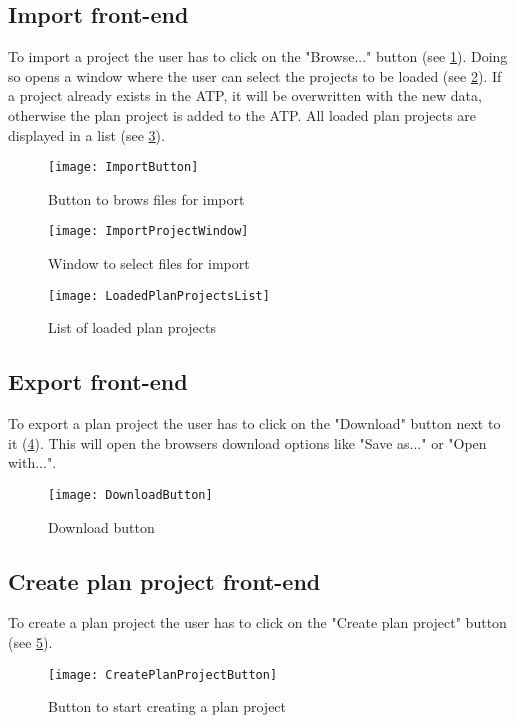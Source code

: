 \subsection{Import front-end}
 To import a project the user has to click on the "Browse..." button (see \ref{importButton}). Doing so opens a window where the user can select the projects to be loaded (see \ref{importWindow}). If a project already exists in the ATP, it will be overwritten with the new data, otherwise the plan project is added to the ATP. All loaded plan projects are displayed in a list (see \ref{loadedPlanProjects}).
\begin{figure}[H]
	\centering
	\texttt{[image: ImportButton]}
	\caption{Button to brows files for import}
	\label{importButton}
\end{figure}
\begin{figure}[H]
	\centering
	\texttt{[image: ImportProjectWindow]}
	\caption{Window to select files for import}
	\label{importWindow}
\end{figure}
\begin{figure}[H]
	\centering
	\texttt{[image: LoadedPlanProjectsList]}
	\caption{List of loaded plan projects}
	\label{loadedPlanProjects}
\end{figure}

\subsection{Export front-end}
To export a plan project the user has to click on the "Download" button next to it (\ref{downloadButton}). This will open the browsers download options like "Save as..." or "Open with...".
\begin{figure}[H]
	\centering
	\texttt{[image: DownloadButton]}
	\caption{Download button}
	\label{downloadButton}
\end{figure}

\subsection{Create plan project front-end}
To create a plan project the user has to click on the "Create plan project" button (see \ref{createPlanProjectButton}). 
\begin{figure}[H]
	\centering
	\texttt{[image: CreatePlanProjectButton]}
	\caption{Button to start creating a plan project}
	\label{createPlanProjectButton}
\end{figure}

